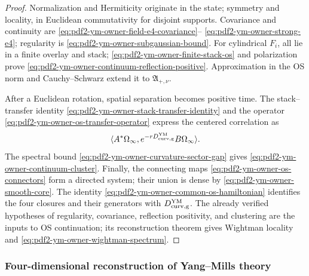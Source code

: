 \begin{proof}
Normalization and Hermiticity originate in the state; symmetry and locality, in
Euclidean commutativity for disjoint supports. Covariance and continuity are
\eqref{eq:pdf2-ym-owner-field-e4-covariance}--
\eqref{eq:pdf2-ym-owner-strong-e4}; regularity is
\eqref{eq:pdf2-ym-owner-subgaussian-bound}. For cylindrical
$F_i$, all lie in a finite overlay and stack;
\eqref{eq:pdf2-ym-owner-finite-stack-os} and polarization prove
\eqref{eq:pdf2-ym-owner-continuum-reflection-positive}. Approximation in the OS norm
and Cauchy--Schwarz extend it to $\mathfrak A_{+,\nu}$.

After a Euclidean rotation, spatial separation becomes positive time.
The stack--transfer identity
\eqref{eq:pdf2-ym-owner-stack-transfer-identity} and the operator
\eqref{eq:pdf2-ym-owner-os-transfer-operator} express the centered correlation as
\[
 \langle A^*\Omega_\infty,
 e^{-rD_{\rm curv,g}^{\rm YM}}B\Omega_\infty\rangle.
\]
The spectral bound \eqref{eq:pdf2-ym-owner-curvature-sector-gap} gives
\eqref{eq:pdf2-ym-owner-continuum-cluster}. Finally, the connecting maps
\eqref{eq:pdf2-ym-owner-os-connectors} form a directed system; their union is dense
by \eqref{eq:pdf2-ym-owner-smooth-core}. The identity
\eqref{eq:pdf2-ym-owner-common-os-hamiltonian} identifies the four closures and their
generators with $D_{\rm curv,g}^{\rm YM}$. The already verified hypotheses of regularity,
covariance, reflection positivity, and clustering are the inputs to OS continuation; its reconstruction
theorem gives Wightman locality and
\eqref{eq:pdf2-ym-owner-wightman-spectrum}.
\end{proof}

\subsubsection{Four-dimensional reconstruction of Yang--Mills theory}

